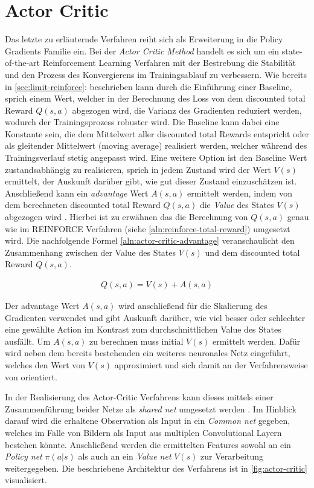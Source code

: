 \documentclass[11pt]{scrartcl}
\begin{document}
\section{Actor Critic}
Das letzte zu erläuternde Verfahren reiht sich als Erweiterung in die Policy Gradients Familie ein.
Bei der \textit{Actor Critic Method} handelt es sich um ein state-of-the-art Reinforcement Learning
Verfahren mit der Bestrebung die Stabilität und den Prozess des Konvergierens im Trainingsablauf
zu verbessern. Wie bereits in \autoref{sec:limit-reinforce}:  beschrieben
kann durch die Einführung einer Baseline, sprich einem Wert, welcher in der Berechnung des Loss von dem
discounted total Reward $Q(s,a)$ abgezogen wird, die Varianz des Gradienten reduziert werden, wodurch
der Trainingsprozess robuster wird. Die Baseline kann dabei eine Konstante sein, die dem Mittelwert 
aller discounted total Rewards entspricht oder als gleitender Mittelwert (moving average) realisiert
werden, welcher während des Trainingsverlauf stetig angepasst wird. Eine weitere Option ist den Baseline
Wert zustandsabhängig zu realisieren, sprich in jedem Zustand wird der Wert $V(s)$ ermittelt, der Auskunft
darüber gibt, wie gut dieser Zustand einzuschätzen ist. Anschließend kann ein \textit{advantage} Wert
$A(s,a)$ ermittelt werden, indem von dem berechneten discounted total Reward $Q(s,a)$ die \textit{Value}
des States $V(s)$ abgezogen wird \cite[~S.268 ff.]{L2018}. Hierbei ist zu erwähnen das die Berechnung von
$Q(s,a)$ genau wie im REINFORCE Verfahren (siehe \autoref{aln:reinforce-total-reward}) umgesetzt wird.
Die nachfolgende Formel \ref{aln:actor-critic-advantage} veranschaulicht den Zusammenhang zwischen der
Value des States $V(s)$ und dem discounted total Reward $Q(s,a)$.

\begin{align}
Q(s,a)=V(s)+A(s,a)
\label{aln:actor-critic-advantage}
\end{align}

Der advantage Wert $A(s,a)$ wird anschließend für die Skalierung des Gradienten verwendet und gibt Auskunft
darüber, wie viel besser oder schlechter eine gewählte Action im Kontrast zum durchschnittlichen Value des
States ausfällt. Um $A(s,a)$ zu berechnen muss initial $V(s)$ ermittelt werden. Dafür wird neben dem bereits
bestehenden ein weiteres neuronales Netz eingeführt, welches den Wert von $V(s)$ approximiert und sich damit
an der Verfahrensweise von  orientiert.

In der Realisierung des Actor-Critic Verfahrens kann dieses mittels einer Zusammenführung beider Netze als
\textit{shared net} umgesetzt werden  \cite[~S.269]{L2018}. Im Hinblick darauf wird die erhaltene
Observation als Input in ein \textit{Common net} gegeben, welches im Falle von Bildern als Input aus
multiplen Convolutional Layern bestehen könnte. Anschließend werden die ermittelten Features sowohl an
ein \textit{Policy net} $\pi(a|s)$ als auch an ein \textit{Value net} $V(s)$ zur Verarbeitung
weitergegeben. Die beschriebene Architektur des Verfahrens ist in \autoref{fig:actor-critic}
visualisiert.
\end{document}
